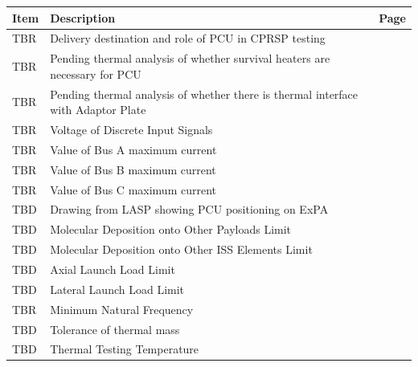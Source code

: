 \documentclass[12pt,oneside,oldfontcommands]{memoir}
\begin{document}
            \clearpage
            \sffamily
            \bfseries
            \normalfont
            \centering
            \begin{table}[htbp]
            \begin{minipage}{\linewidth}
            \setlength{\tymax}{0.5\linewidth}
            \centering
            \small\begin{tabular}{| >{\centering\arraybackslash}m{1.25in}| >{\centering\arraybackslash}m{2.95in}| >{\centering\arraybackslash}m{1.5in}|} \hline
            \bfseries{Item} & \bfseries{Description} & \bfseries{Page}\\
            \hline
            TBR & Delivery destination and role of PCU in CPRSP testing & \pageref{tbx_1}  \\ 
 \hline 
TBR & Pending thermal analysis of whether survival heaters are necessary for PCU & \pageref{tbx_2}  \\ 
 \hline 
TBR & Pending thermal analysis of whether there is thermal interface with Adaptor Plate & \pageref{tbx_3}  \\ 
 \hline 
TBR & Voltage of Discrete Input Signals & \pageref{tbx_4}  \\ 
 \hline 
TBR & Value of Bus A maximum current & \pageref{tbx_5}  \\ 
 \hline 
TBR & Value of Bus B maximum current & \pageref{tbx_6}  \\ 
 \hline 
TBR & Value of Bus C maximum current & \pageref{tbx_7}  \\ 
 \hline 
TBD & Drawing from LASP showing PCU positioning on ExPA & \pageref{tbx_8}  \\ 
 \hline 
TBD & Molecular Deposition onto Other Payloads Limit & \pageref{tbx_9}  \\ 
 \hline 
TBD & Molecular Deposition onto Other ISS Elements Limit & \pageref{tbx_10}  \\ 
 \hline 
TBD & Axial Launch Load Limit & \pageref{tbx_11}  \\ 
 \hline 
TBD & Lateral Launch Load Limit & \pageref{tbx_12}  \\ 
 \hline 
TBR & Minimum Natural Frequency & \pageref{tbx_13}  \\ 
 \hline 
TBD & Tolerance of thermal mass & \pageref{tbx_14}  \\ 
 \hline 
TBD & Thermal Testing Temperature & \pageref{tbx_15}  \\ 
 \hline 
\end{tabular}
        \end{minipage}
        \end{table}
        \raggedright
        \clearpage%
\clearpage
\end{document}
